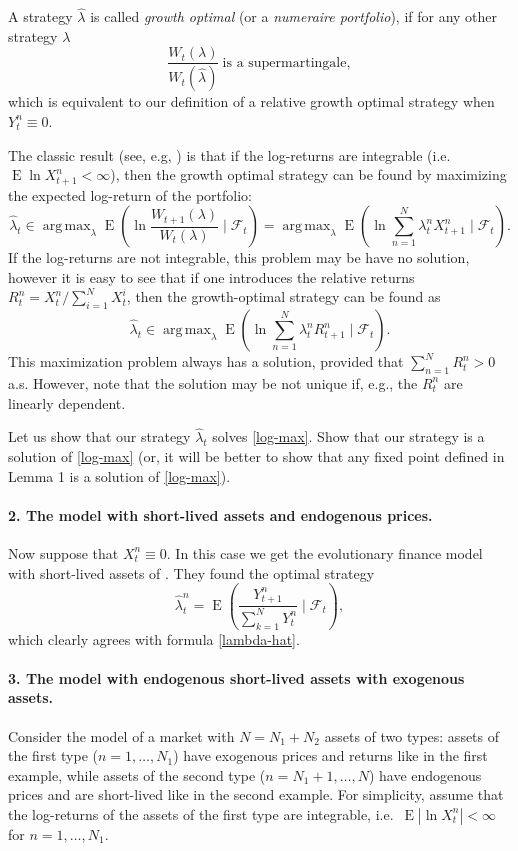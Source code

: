 \documentclass[a4paper,11pt,english]{article}
\theoremstyle{definition}
\DeclareMathOperator{\E}{E}
\DeclareMathOperator{\argmax}{arg\,max}
\renewcommand{\hat}{\widehat}
\newcommand{\F}{\mathcal{F}}
\newcommand{\red}[1]{{\color{red}#1}}
\begin{document}
A strategy $\hat\lambda$ is called \textit{growth optimal} (or a \textit{numeraire portfolio}), if for any other strategy $\lambda$
\[
\frac{W_t(\lambda)}{W_t(\hat\lambda)}\ \text{is a supermartingale},
\]
which is equivalent to our definition of a relative growth optimal strategy when $Y_t^n\equiv0$. 

The classic result (see, e.g, \cite{AlgoetCover88}) is that if the log-returns are integrable (i.e. $\E \ln X_{t+1}^n < \infty$), then the growth optimal strategy can be found by maximizing the expected log-return of the portfolio:
\[
\hat\lambda_t \in \argmax_{\lambda} \E\left(\ln \frac{W_{t+1}(\lambda)}{W_t(\lambda)} \mid \F_t\right)= 
\argmax_{\lambda} \E\left(\ln \sum_{n=1}^N \lambda_t^{n}  X_{t+1}^n\mid \F_t\right).
\]
If the log-returns are not integrable, this problem may be have no solution, however it is easy to see that if one introduces the relative returns $R_t^n = X_t^n /\sum_{i=1}^N X_t^i$, then the growth-optimal strategy can be found as 
\begin{equation}
\label{log-max}
\hat\lambda_t \in
\argmax_{\lambda} \E\left(\ln \sum_{n=1}^N \lambda_t^{n}  R_{t+1}^n\mid \F_t\right).
\end{equation}
This maximization problem always has a solution, provided that $\sum_{n=1}^N R_t^n > 0$ a.s. However, note that the solution may be not unique if, e.g., the $R_t^n$ are linearly dependent. 

Let us show that our strategy $\hat\lambda_t$ solves \eqref{log-max}. 
\red{Show that our strategy is a solution of \eqref{log-max} (or, it will be better to show that any fixed point defined in Lemma 1 is a solution of \eqref{log-max})}.


\paragraph{2. The model with short-lived assets and endogenous prices.} Now suppose that $X_t^n\equiv 0$. In this case we get the evolutionary finance model with short-lived assets of \cite{AmirEvstigneev+13}. They found the optimal strategy
\[
\hat\lambda_t^n = \E\left( \frac{Y_{t+1}^n}{\sum_{k=1}^N Y_t^{n}} \mid \F_t\right),
\]
which clearly agrees with formula \eqref{lambda-hat}.

\paragraph{3. The model with endogenous short-lived assets with exogenous assets.} 
Consider the model of a market with $N=N_1+N_2$ assets of two types: assets of the first type ($n=1,\dots,N_1$) have exogenous prices and returns like in the first example, while assets of the second type ($n=N_1+1,\ldots,N$) have endogenous prices and are short-lived like in the second example. For simplicity, assume that the log-returns of the assets of the first type are integrable, i.e.\ $\E |\ln X_t^n| < \infty$ for $n=1,\ldots,N_1$.
\end{document}
